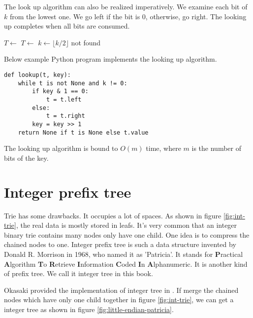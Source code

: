 \documentclass{article}
\begin{document}
The look up algorithm can also be realized imperatively. We examine each
bit of $k$ from the lowest one. We go left if the bit is 0, otherwise,
go right. The looking up completes when all bits are consumed.

\begin{algorithmic}[1]
      \State $T \gets$ 
    \Else
      \State $T \gets$ 
    \EndIf
    \State $k \gets \lfloor k/2 \rfloor$
  \EndWhile
    \State \Return {}
  \Else
    \State \Return not found \EndIf
\EndFunction
\end{algorithmic}

Below example Python program implements the looking up algorithm.

\lstset{language=Python}
\begin{lstlisting}
def lookup(t, key):
    while t is not None and k != 0:
        if key & 1 == 0:
            t = t.left
        else:
            t = t.right
        key = key >> 1
    return None if t is None else t.value
\end{lstlisting}

The looking up algorithm is bound to $O(m)$ time, where $m$ is the
number of bits of the key.

\section{Integer prefix tree}
\label{int-patricia}

Trie has some drawbacks. It occupies a lot of
spaces. As shown in figure \ref{fig:int-trie}, the real data is mostly stored in leafs.
It's very common that an integer binary trie contains many nodes only have one child.
One idea is to compress the chained nodes to one.
Integer prefix tree is such a data structure invented by
Donald R. Morrison in 1968, who named it as 'Patricia'. It stands for \textbf{P}ractical \textbf{A}lgorithm \textbf{T}o \textbf{R}etrieve \textbf{I}nformation \textbf{C}oded \textbf{I}n \textbf{A}lphanumeric\cite{patricia-morrison}. It is another kind of prefix tree. We call it integer tree in this book.

Okasaki provided the implementation of integer tree in \cite{okasaki-int-map}.
If merge the chained nodes which have only one child together in figure \ref{fig:int-trie}, we can get a integer tree as shown in figure \ref{fig:little-endian-patricia}.
\end{document}
